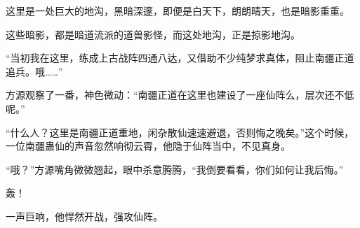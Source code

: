 \begin{this_body}
这里是一处巨大的地沟，黑暗深邃，即便是白天下，朗朗晴天，也是暗影重重。

这些暗影，都是暗道流派的道兽影怪，而这处地沟，正是掠影地沟。

“当初我在这里，练成上古战阵四通八达，又借助不少纯梦求真体，阻止南疆正道追兵。哦……”

方源观察了一番，神色微动：“南疆正道在这里也建设了一座仙阵么，层次还不低呢。”

“什么人？这里是南疆正道重地，闲杂散仙速速避退，否则悔之晚矣。”这个时候，一位南疆蛊仙的声音忽然响彻云霄，他隐于仙阵当中，不见真身。

“哦？”方源嘴角微微翘起，眼中杀意腾腾，“我倒要看看，你们如何让我后悔。”

轰！

一声巨响，他悍然开战，强攻仙阵。

\end{this_body}


